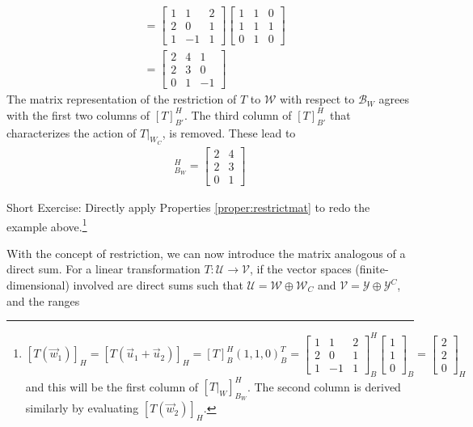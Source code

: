 \begin{solution}
\begin{align*}
&= \begin{bmatrix}
1 & 1 & 2 \\
2 & 0 & 1 \\
1 & -1 & 1
\end{bmatrix}
\begin{bmatrix}
1 & 1 & 0 \\
1 & 1 & 1 \\
0 & 1 & 0
\end{bmatrix} \\
&=
\begin{bmatrix}
2 & 4 & 1 \\
2 & 3 & 0 \\
0 & 1 & -1
\end{bmatrix}
\end{align*}
The matrix representation of the restriction of $T$ to $\mathcal{W}$ with respect to $\mathcal{B}_W$ agrees with the first two columns of $[T]_{B'}^H$. The third column of $[T]_{B'}^H$ that characterizes the action of $T|_{W_C}$, is removed. These lead to
\begin{align*}
[T|_W]_{B_W}^H =
\begin{bmatrix}
2 & 4 \\
2 & 3 \\
0 & 1 
\end{bmatrix}
\end{align*}
\end{solution}
Short Exercise: Directly apply Properties \ref{proper:restrictmat} to redo the example above.\footnote{$[T(\vec{w}_1)]_H = [T(\vec{u}_1+\vec{u}_2)]_H = [T]_B^H(1,1,0)_B^T =
\begin{bmatrix}
1 & 1 & 2 \\
2 & 0 & 1 \\
1 & -1 & 1
\end{bmatrix}_B^H
\begin{bmatrix}
1 \\
1 \\
0
\end{bmatrix}_B
= \begin{bmatrix}
2 \\
2 \\
0
\end{bmatrix}_H
$ and this will be the first column of $[T|_W]_{B_W}^H$. The second column is derived similarly by evaluating $[T(\vec{w}_2)]_H$.}\par
With the concept of restriction, we can now introduce the matrix analogous of a direct sum. For a linear transformation $T: \mathcal{U} \to \mathcal{V}$, if the vector spaces (finite-dimensional) involved are direct sums such that $\mathcal{U} = \mathcal{W} \oplus \mathcal{W}_C$ and $\mathcal{V} = \mathcal{Y} \oplus \mathcal{Y}^C$, and the ranges
